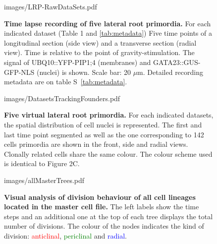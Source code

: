 \documentclass[11pt,a4paper, draft]{article}
\begin{document}
%
\clearpage
%
\begin{figure}[htbp]
	\begin{center}
	\begin{overpic}[width=1.\linewidth]{images/LRP-RawDataSets.pdf}
	\end{overpic}
\caption[Time lapse recording of five lateral root primordia.]
{{\bf Time lapse recording of five lateral root primordia.} For each indicated dataset (Table 1 and \ref{tab:metadata}) Five time points of a longitudinal section (side view) and a transverse section (radial view). Time is relative to the point of gravity-stimulation. The signal of UBQ10::YFP-PIP1;4 (membranes) and GATA23::GUS-GFP-NLS (nuclei) is shown. Scale bar: 20 $\mu$m. Detailed recording metadata are on table S~\ref{tab:metadata}.}
	\label{fig:alldatasets}
	\end{center}
\end{figure}
%
\clearpage
\begin{figure}[htbp]
	\begin{center}
	\begin{overpic}[width=1.\linewidth]{images/DatasetsTrackingFounders.pdf}
	\end{overpic}
\caption[Five virtual lateral root primordia.]
{{\bf Five virtual lateral root primordia.} For each indicated datasets, the spatial distribution of cell nuclei is represented. The first and last time point segmented as well as the one corresponding to 142 cells primordia are shown in the front, side and radial views. Clonally related cells share the same colour. The colour scheme used is identical to Figure 2C. }
	\label{fig:trackingfounders}
	\end{center}
\end{figure}
%
\clearpage
%
\begin{figure}
	\begin{center}
		\begin{overpic}[width=0.8\linewidth]{images/allMasterTrees.pdf}
		\end{overpic}
\caption[Visual analysis of division behaviour of all cell lineages located in the master cell file.]
{
{\bf Visual analysis of division behaviour of all cell lineages located in the master cell file.} The left labels show the time steps and an additional one at the top of each tree displays the total number of divisions. The colour of the nodes indicates the kind of division: \textcolor{red}{anticlinal}, \textcolor{green}{periclinal} and \textcolor{blue}{radial}.
}
	\label{fig:allMasterTrees}
	\end{center}
\end{figure}
\end{document}
